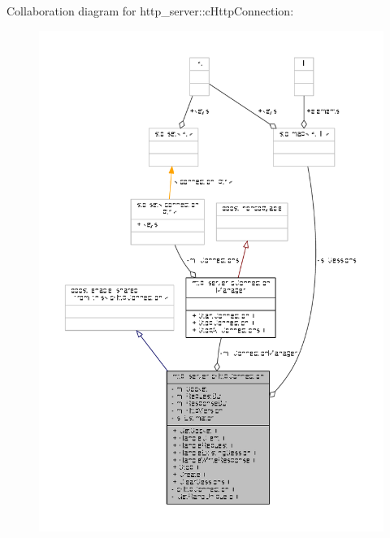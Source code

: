 Collaboration diagram for http\-\_\-server\-:\-:c\-Http\-Connection\-:
\nopagebreak
\begin{figure}[H]
\begin{center}
\leavevmode
\includegraphics[width=350pt]{classhttp__server_1_1cHttpConnection__coll__graph}
\end{center}
\end{figure}
